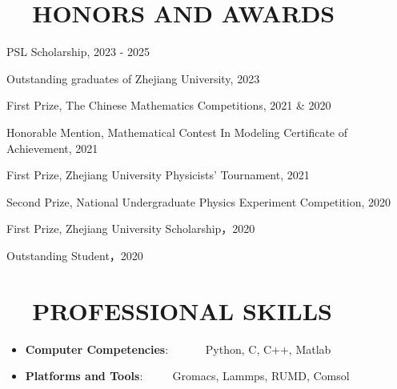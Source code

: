 \documentclass[UTF8]{ctexart}
\newcommand{\resumeItem}[2]{
  \item\small{
    \textbf{#1}{: #2 \vspace{-2pt}}
  }
}
\newcommand{\resumeSubItem}[2]{\resumeItem{#1}{#2}\vspace{-3pt}}
\newcommand{\resumeSubHeadingListStart}{\begin{itemize}[leftmargin=*]}
\newcommand{\resumeSubHeadingListEnd}{\end{itemize}}
\begin{document}
\section{~~HONORS AND AWARDS}
\begin{description}[font=$\bullet$]
\item {PSL Scholarship, 2023 - 2025}
\vspace{-5pt}
\item {Outstanding graduates of Zhejiang University, 2023}
\vspace{-5pt}
\item {First Prize, The Chinese Mathematics Competitions, 2021 \& 2020}
\vspace{-5pt}
\item {Honorable Mention, Mathematical Contest In Modeling Certificate of Achievement, 2021}
\vspace{-5pt}
\item {First Prize, Zhejiang University Physicists' Tournament, 2021}
\vspace{-5pt}
\item {Second Prize, National Undergraduate Physics Experiment Competition, 2020 }
\vspace{-5pt}
\item {First Prize, Zhejiang University Scholarship，2020}
\vspace{-5pt}
\item {Outstanding Student，2020}
\vspace{-5pt}

\end{description}

\vspace{-5pt}

\section{~~PROFESSIONAL SKILLS}
	\resumeSubHeadingListStart
	\resumeSubItem{Computer Competencies}{~~~~~~Python, C, C++, Matlab}
	\resumeSubItem{Platforms and Tools}{~~~~ Gromacs, Lammps, RUMD, Comsol}

\resumeSubHeadingListEnd
\end{document}
